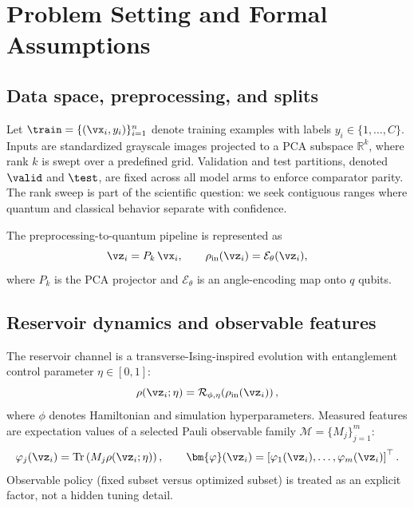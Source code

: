 \documentclass{article} %
\begin{document}
\section{Problem Setting and Formal Assumptions}\label{sec:problem}
\subsection{Data space, preprocessing, and splits}
Let $\train=\{(\vx_i,y_i)\}_{i=1}^n$ denote training examples with labels $y_i\in\{1,\dots,C\}$. Inputs are standardized grayscale images projected to a PCA subspace $\mathbb{R}^{k}$, where rank $k$ is swept over a predefined grid. Validation and test partitions, denoted $\valid$ and $\test$, are fixed across all model arms to enforce comparator parity. The rank sweep is part of the scientific question: we seek contiguous ranges where quantum and classical behavior separate with confidence.

The preprocessing-to-quantum pipeline is represented as
\begin{equation}
\vz_i = P_k\,\vx_i, \qquad \rho_{\text{in}}(\vz_i)=\mathcal{E}_{\theta}(\vz_i),
\label{eq:encoding}
\end{equation}
where $P_k$ is the PCA projector and $\mathcal{E}_{\theta}$ is an angle-encoding map onto $q$ qubits.

\subsection{Reservoir dynamics and observable features}
The reservoir channel is a transverse-Ising-inspired evolution with entanglement control parameter $\eta\in[0,1]$:
\begin{equation}
\rho(\vz_i;\eta)=\mathcal{R}_{\phi,\eta}\!\left(\rho_{\text{in}}(\vz_i)\right),
\label{eq:reservoir}
\end{equation}
where $\phi$ denotes Hamiltonian and simulation hyperparameters. Measured features are expectation values of a selected Pauli observable family $\mathcal{M}=\{M_j\}_{j=1}^{m}$:
\begin{equation}
\varphi_j(\vz_i)=\mathrm{Tr}\left(M_j\rho(\vz_i;\eta)\right), \qquad
\bm{\varphi}(\vz_i)=\left[\varphi_1(\vz_i),\dots,\varphi_m(\vz_i)\right]^\top.
\label{eq:featuremap}
\end{equation}
Observable policy (fixed subset versus optimized subset) is treated as an explicit factor, not a hidden tuning detail.
\end{document}
